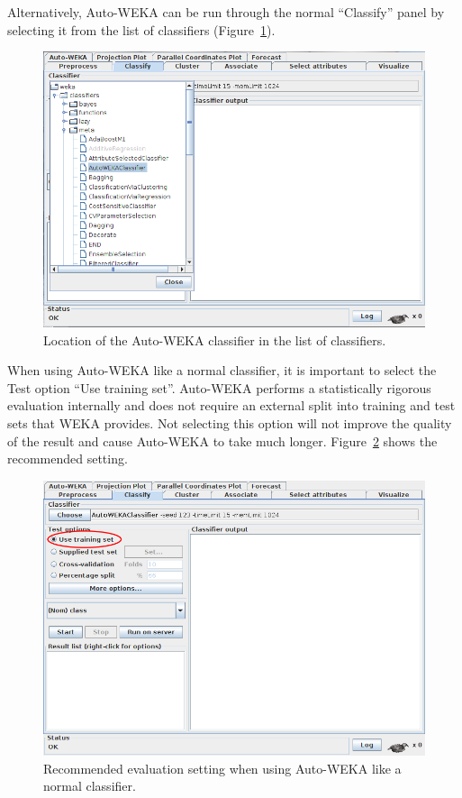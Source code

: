 \documentclass{article}
\begin{document}
Alternatively, Auto-WEKA can be run through the normal ``Classify'' panel by
selecting it from the list of classifiers (Figure~\ref{fig:classifier}).

\begin{figure}[!ht]
\begin{center}
\includegraphics[width=.8\textwidth]{classifier}
\caption{Location of the Auto-WEKA classifier in the list of classifiers.}
\label{fig:classifier}
\end{center}
\end{figure}

When using Auto-WEKA like a normal classifier, it is important to select the
Test option ``Use training set''. Auto-WEKA performs a statistically rigorous
evaluation internally and does not require an external split into training and
test sets that WEKA provides. Not selecting this option will not improve the
quality of the result and cause Auto-WEKA to take much longer.
Figure~\ref{fig:train} shows the recommended setting.

\begin{figure}[!ht]
\begin{center}
\includegraphics[width=.8\textwidth]{train}
\caption{Recommended evaluation setting when using Auto-WEKA like a normal
classifier.}
\label{fig:train}
\end{center}
\end{figure}
\end{document}
